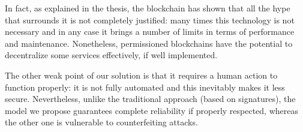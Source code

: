 In fact, as explained in the thesis, the blockchain has shown that all the hype that surrounds it is not completely justified: many times this technology is not necessary and in any case it brings a number of limits in terms of performance and maintenance. Nonetheless, permissioned blockchains have the potential to decentralize some services effectively, if well implemented.

The other weak point of our solution is that it requires a human action to function properly: it is not fully automated and this inevitably makes it less secure. Nevertheless, unlike the traditional approach (based on signatures), the model we propose guarantees complete reliability if properly respected, whereas the other one is vulnerable to counterfeiting attacks.


